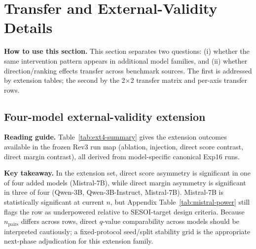 \section{Transfer and External-Validity Details}
\noindent\textbf{How to use this section.} This section separates two questions: (i) whether the same intervention pattern appears in additional model families, and (ii) whether direction/ranking effects transfer across benchmark sources. The first is addressed by extension tables; the second by the 2$\times$2 transfer matrix and per-axis transfer rows.
\subsection{Four-model external-validity extension}
\noindent\textbf{Reading guide.} Table~\ref{tab:ext4-summary} gives the extension outcomes available in the frozen Rev3 run map (ablation, injection, direct score contrast, direct margin contrast), all derived from model-specific canonical Exp16 runs.
\begin{table}[H]
\centering
\footnotesize
\setlength{\tabcolsep}{3pt}
\caption{Four-model external-validity extension: primary intervention and direct asymmetry outcomes.}
\label{tab:ext4-summary}
\end{table}

\noindent\textbf{Key takeaway.} In the extension set, direct score asymmetry is significant in one of four added models (Mistral-7B), while direct margin asymmetry is significant in three of four (Qwen-3B, Qwen-3B-Instruct, Mistral-7B). Mistral-7B is statistically significant at current \(n\), but Appendix Table~\ref{tab:mistral-power} still flags the row as underpowered relative to SESOI-target design criteria. Because \(n_{\text{pairs}}\) differs across rows, direct \(q\)-value comparability across models should be interpreted cautiously; a fixed-protocol seed/split stability grid is the appropriate next-phase adjudication for this extension family.


